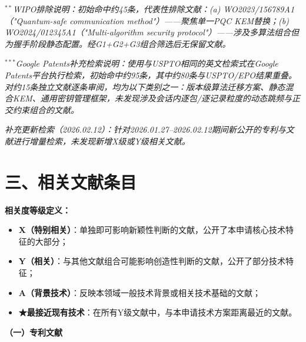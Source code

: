 \documentclass[12pt,a4paper]{article}
\begin{document}
\noindent\textit{$^{**}$WIPO排除说明：初始命中约45条，代表性排除文献：(a) WO2023/156789A1（"Quantum-safe communication method"）——聚焦单一PQC KEM替换；(b) WO2024/012345A1（"Multi-algorithm security protocol"）——涉及多算法组合但为握手阶段静态配置。经G1+G2+G3组合筛选后无保留文献。}

\noindent\textit{$^{***}$Google Patents补充检索说明：使用与USPTO相同的英文检索式在Google Patents平台执行检索，初始命中约95条，其中约80条与USPTO/EPO结果重叠。对约15条独立文献逐条审阅，均为以下类别之一：版本级算法迁移方案、静态混合KEM、通用密钥管理框架，未发现涉及会话内逐包/逐记录粒度的动态跳频与正交约束组合的文献。}

\noindent\textit{补充更新检索（2026.02.12）：针对2026.01.27--2026.02.12期间新公开的专利与文献进行增量检索，未发现新增X级或Y级相关文献。}

\section*{三、相关文献条目}

\textbf{相关度等级定义：}
\begin{itemize}[leftmargin=2em]
    \item \textbf{X（特别相关）}：单独即可影响新颖性判断的文献，公开了本申请核心技术特征的大部分；
    \item \textbf{Y（相关）}：与其他文献组合可能影响创造性判断的文献，公开了部分技术特征；
    \item \textbf{A（背景技术）}：反映本领域一般技术背景或相关技术基础的文献；
    \item \textbf{★最接近现有技术}：在所有Y级文献中，与本申请技术方案距离最近的文献。
\end{itemize}

\vspace{0.5em}

\textbf{（一）专利文献}
\end{document}
